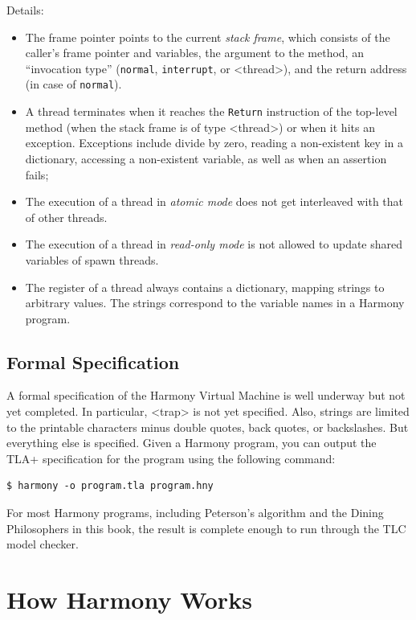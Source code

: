 \documentclass{report}
\newenvironment{code}{
\tcolorbox
}{
\endtcolorbox
}
\begin{document}
Details:
\begin{itemize}
\item The frame pointer points to the current \emph{stack frame},
which consists of the caller's frame pointer and variables, the argument to
the method, an ``invocation type'' (\texttt{normal}, \texttt{interrupt}, or
<{thread}>), and the return address (in case of \texttt{normal}).
\item A thread terminates when it reaches the \texttt{Return} instruction
of the top-level method (when the stack frame is of type <{thread}>)
or when it hits an exception.  Exceptions include divide by zero,
reading a non-existent key in a dictionary, accessing a non-existent
variable, as well as when an assertion fails;
\item The execution of a thread in \emph{atomic mode} does not get interleaved
with that of other threads.
\item The execution of a thread in \emph{read-only mode} is not allowed
to update shared variables of spawn threads.
\item The register of a thread always contains a dictionary, mapping
strings to arbitrary values.  The strings correspond to the variable names
in a Harmony program.
\end{itemize}

\section{Formal Specification}
\label{ap:formal}

A formal specification of the Harmony Virtual Machine is well underway but
not yet completed.  In particular, <{trap}> is not yet specified.
Also, strings are limited to the printable characters minus
double quotes, back quotes, or backslashes.
But everything else is specified.
Given a Harmony program, you can output the TLA+ specification for
the program using the following command:

\begin{code}
\begin{verbatim}
$ harmony -o program.tla program.hny
\end{verbatim}
\end{code}

For most Harmony programs, including Peterson's algorithm and the Dining
Philosophers in this book, the result is complete enough to run through
the TLC model checker.

\chapter{How Harmony Works}\label{ap:howitworks}
\end{document}
